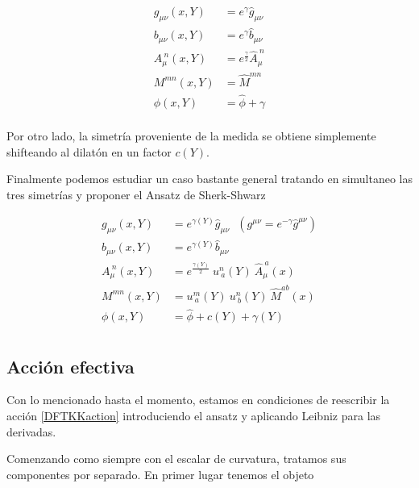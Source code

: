 \documentclass{article}
\numberwithin{equation}{section}
\begin{document}
\begin{equation}
\begin{aligned}
g_{\mu \nu}(x,Y)&= e^{\gamma}\hat{g}_{\mu \nu}\\
b_{\mu \nu}(x,Y)&= e^{\gamma} \hat{b}_{\mu \nu}\\
A_{\mu}^{\ n}(x,Y)&= e^{\frac{\gamma}{2}} \hat{A}_{\mu}^{\ n}\\
M^{m n}(x,Y)&= \hat{M}^{m n}\\
\phi(x,Y)&= \hat{\phi} + \gamma\\
\end{aligned}
\end{equation} 

Por otro lado, la simetría proveniente de la medida se obtiene simplemente shifteando al dilatón en un factor $ c(Y) $.

Finalmente podemos estudiar un caso bastante general tratando en simultaneo las tres simetrías y proponer el Ansatz de Sherk-Shwarz\\

\begin{boxeq}
	\begin{equation}
	\begin{aligned}
	g_{\mu \nu}(x,Y)&= e^{\gamma(Y)}\hat{g}_{\mu \nu} \ \ \ (g^{\mu \nu} = e^{-\gamma}\hat{g}^{\mu \nu})\\
	b_{\mu \nu}(x,Y)&= e^{\gamma(Y)} \hat{b}_{\mu \nu}\\
	A_{\mu}^{\ n}(x,Y)&= e^{\frac{\gamma(Y)}{2}} \ u^{n}_{\ a}(Y) \ \hat{A}_{\mu}^{\ a}(x)\\
	M^{m n}(x,Y)&= u^{m}_{\ a}(Y) \ u^{n}_{\ b}(Y) \ \hat{M}^{a b}(x)\\
	\phi(x,Y)&= \hat{\phi} + c(Y) + \gamma(Y)\\
	\end{aligned}
	\end{equation}
\end{boxeq}

\vspace{.5cm}

\subsection{Acción efectiva}

Con lo mencionado hasta el momento, estamos en condiciones de reescribir la acción \ref{DFTKKaction}
introduciendo el ansatz y aplicando Leibniz para las derivadas.

Comenzando como siempre con el escalar de curvatura, tratamos sus componentes por separado. En primer lugar tenemos el objeto
\end{document}
